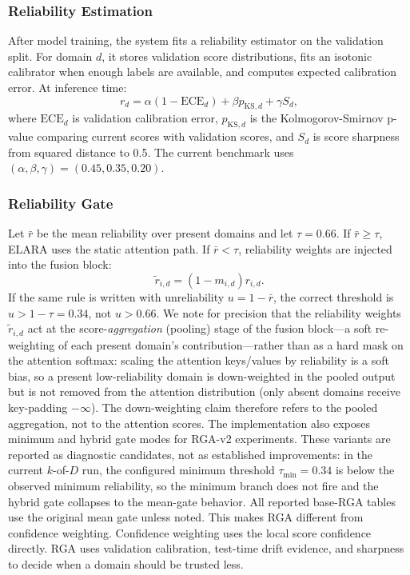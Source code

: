 \documentclass[10pt,conference]{IEEEtran}
\newcommand{\system}{ELARA}
\newcommand{\method}{RGA}
\begin{document}
\subsubsection{Reliability Estimation}
After model training, the system fits a reliability estimator on the validation
split. For domain $d$, it stores validation score distributions, fits an
isotonic calibrator when enough labels are available, and computes expected
calibration error. At inference time:
\begin{equation}
  r_d =
  \alpha(1-\mathrm{ECE}_d)
  + \beta p_{\mathrm{KS},d}
  + \gamma S_d,
  \label{eq:reliability}
\end{equation}
where $\mathrm{ECE}_d$ is validation calibration error,
$p_{\mathrm{KS},d}$ is the Kolmogorov-Smirnov p-value comparing current scores
with validation scores, and $S_d$ is score sharpness from squared distance to
0.5. The current benchmark uses $(\alpha,\beta,\gamma)=(0.45,0.35,0.20)$.

\subsubsection{Reliability Gate}
Let $\bar{r}$ be the mean reliability over present domains and let $\tau=0.66$.
If $\bar{r}\geq\tau$, \system{} uses the static attention path. If
$\bar{r}<\tau$, reliability weights are injected into the fusion block:
\begin{equation}
  \tilde{r}_{i,d} = (1-m_{i,d})r_{i,d}.
\end{equation}
If the same rule is written with unreliability $u=1-\bar r$, the correct
threshold is $u>1-\tau=0.34$, not $u>0.66$. We note for precision that the
reliability weights $\tilde r_{i,d}$ act at the score-\emph{aggregation} (pooling)
stage of the fusion block---a soft re-weighting of each present domain's
contribution---rather than as a hard mask on the attention softmax: scaling the
attention keys/values by reliability is a soft bias, so a present low-reliability
domain is down-weighted in the pooled output but is not removed from the attention
distribution (only absent domains receive key-padding $-\infty$). The
down-weighting claim therefore refers to the pooled aggregation, not to the
attention scores. The implementation also exposes
minimum and hybrid gate modes for \method{}-v2 experiments. These variants are
reported as diagnostic candidates, not as established improvements: in the
current $k$-of-$D$ run, the configured minimum threshold
$\tau_{\min}=0.34$ is below the observed minimum reliability, so the minimum
branch does not fire and the hybrid gate collapses to the mean-gate behavior.
All reported base-\method{} tables use the original mean gate unless noted.
This makes \method{} different from confidence weighting. Confidence weighting
uses the local score confidence directly. \method{} uses validation calibration,
test-time drift evidence, and sharpness to decide when a domain should be
trusted less.
\end{document}
